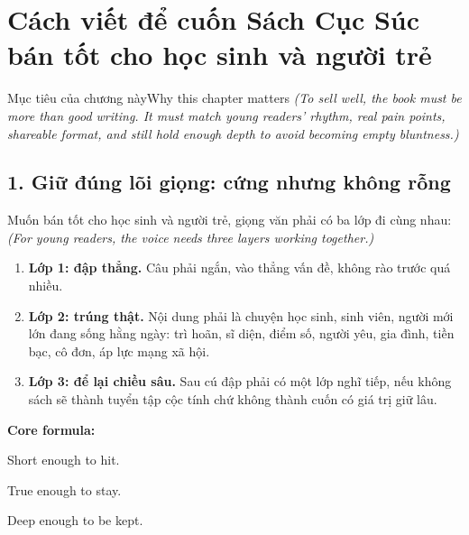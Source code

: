 \chapter{Cách viết để cuốn Sách Cục Súc bán tốt cho học sinh và người trẻ}

\begin{truyen}{Mục tiêu của chương này}{Why this chapter matters}
\textit{(To sell well, the book must be more than good writing. It must match young readers’ rhythm, real pain points, shareable format, and still hold enough depth to avoid becoming empty bluntness.)}
\end{truyen}

\section{1. Giữ đúng lõi giọng: cứng nhưng không rỗng}
\begin{baihoc}
Muốn bán tốt cho học sinh và người trẻ, giọng văn phải có ba lớp đi cùng nhau:
\textit{(For young readers, the voice needs three layers working together.)}
\end{baihoc}

\begin{enumerate}[leftmargin=*]
\item \textbf{Lớp 1: đập thẳng.} Câu phải ngắn, vào thẳng vấn đề, không rào trước quá nhiều.
\item \textbf{Lớp 2: trúng thật.} Nội dung phải là chuyện học sinh, sinh viên, người mới lớn đang sống hằng ngày: trì hoãn, sĩ diện, điểm số, người yêu, gia đình, tiền bạc, cô đơn, áp lực mạng xã hội.
\item \textbf{Lớp 3: để lại chiều sâu.} Sau cú đập phải có một lớp nghĩ tiếp, nếu không sách sẽ thành tuyển tập cộc tính chứ không thành cuốn có giá trị giữ lâu.
\end{enumerate}

\begin{ghinhoanh}
\textbf{Core formula:}

Short enough to hit.

True enough to stay.

Deep enough to be kept.
\end{ghinhoanh}

